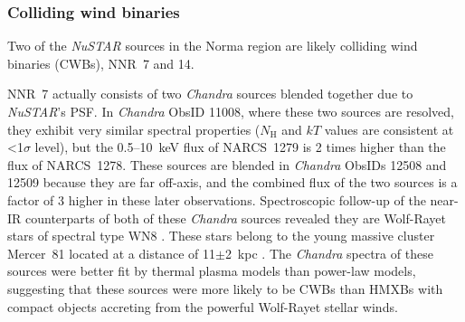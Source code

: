 \documentclass[iop,revtex4]{emulateapj}
\begin{document}
\subsubsection{Colliding wind binaries}
\label{sec:cwb}
Two of the \textit{NuSTAR} sources in the Norma region are likely colliding wind binaries (CWBs), NNR~7 and 14. \par
NNR~7 actually consists of two \textit{Chandra} sources blended together due to \textit{NuSTAR}'s PSF.  In \textit{Chandra} ObsID 11008, where these two sources are resolved, they exhibit very similar spectral properties ($N_{\mathrm{H}}$ and $kT$ values are consistent at <1$\sigma$ level), but the 0.5--10~keV flux of NARCS~1279 is 2 times higher than the flux of NARCS~1278.  These sources are blended in \textit{Chandra} ObsIDs 12508 and 12509 because they are far off-axis, and the combined flux of the two sources is a factor of 3 higher in these later observations.  Spectroscopic follow-up of the near-IR counterparts of both of these \textit{Chandra} sources revealed they are Wolf-Rayet stars of spectral type WN8 \citep{rahoui14}. These stars belong to the young massive cluster Mercer~81 \citep{mercer05} located at a distance of 11$\pm$2~kpc \citep{davies12}.  The \textit{Chandra} spectra of these sources were better fit by thermal plasma models than power-law models, suggesting that these sources were more likely to be CWBs than HMXBs with compact objects accreting from the powerful Wolf-Rayet stellar winds.  \par 
\end{document}
